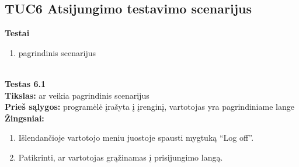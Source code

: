 \documentclass{VUMIFPSkursinis}
\begin{document}
	\subsection{TUC6 Atsijungimo testavimo scenarijus}
		\textbf{Testai}
		\begin{enumerate}[noitemsep,topsep=0pt]
			\item pagrindinis scenarijus
		\end{enumerate}
		\textbf{}\\
		\textbf{Testas 6.1}\\
		\textbf{Tikslas:} ar veikia pagrindinis scenarijus\\
		\textbf{Prieš sąlygos:} programėlė įrašyta į įrenginį, vartotojas yra pagrindiniame lange\\
		\textbf{Žingsniai:}
		\begin{enumerate}[noitemsep,topsep=0pt]
			\item Išlendančioje vartotojo meniu juostoje spausti mygtuką “Log off”.
			\item Patikrinti, ar vartotojas grąžinamas į prisijungimo langą.
		\end{enumerate}
\end{document}
